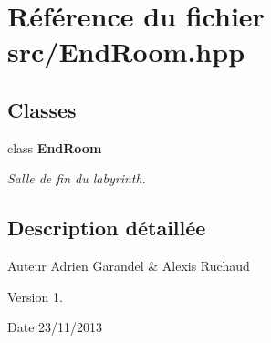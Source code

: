\section{Référence du fichier src/\-End\-Room.hpp}
\label{_end_room_8hpp}
\subsection*{Classes}
\begin{DoxyCompactItemize}
\item 
class {\bf End\-Room}
\begin{DoxyCompactList}\small\item\em Salle de fin du labyrinth. \end{DoxyCompactList}\end{DoxyCompactItemize}


\subsection{Description détaillée}
\begin{DoxyAuthor}{Auteur}
Adrien Garandel \& Alexis Ruchaud 
\end{DoxyAuthor}
\begin{DoxyVersion}{Version}
1. 
\end{DoxyVersion}
\begin{DoxyDate}{Date}
23/11/2013 
\end{DoxyDate}
